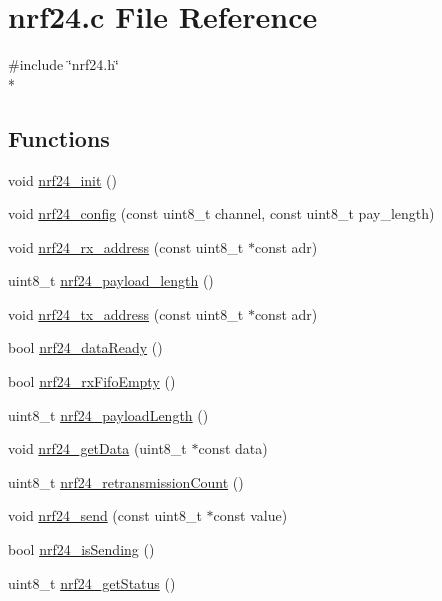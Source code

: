 \hypertarget{a00012}{\section{nrf24.\-c File Reference}
\label{a00012}
}
{\ttfamily \#include \char`\"{}nrf24.\-h\char`\"{}}\\*
\subsection*{Functions}
\begin{DoxyCompactItemize}
\item 
void \hyperlink{a00012_a74436d4829a431fcd9b5ef6ff76d0677}{nrf24\-\_\-init} ()
\item 
void \hyperlink{a00012_a97793f0c66a9d83e7180e54b6054e366}{nrf24\-\_\-config} (const uint8\-\_\-t channel, const uint8\-\_\-t pay\-\_\-length)
\item 
void \hyperlink{a00012_a1677d7e870aeb4a04f6816767bfe2608}{nrf24\-\_\-rx\-\_\-address} (const uint8\-\_\-t $\ast$const adr)
\item 
uint8\-\_\-t \hyperlink{a00012_a2cf62b6425bac2d6f51355a6cf4fe61e}{nrf24\-\_\-payload\-\_\-length} ()
\item 
void \hyperlink{a00012_ace01070c698770b24b2f3e0d22b415e0}{nrf24\-\_\-tx\-\_\-address} (const uint8\-\_\-t $\ast$const adr)
\item 
bool \hyperlink{a00012_a712c0b5e8c339da2e8f36cfbba8892ac}{nrf24\-\_\-data\-Ready} ()
\item 
bool \hyperlink{a00012_a9e05723f5fa753cfb2ea219e90eb3c2b}{nrf24\-\_\-rx\-Fifo\-Empty} ()
\item 
uint8\-\_\-t \hyperlink{a00012_a62aedbae7c08c9e560c6e95466067fce}{nrf24\-\_\-payload\-Length} ()
\item 
void \hyperlink{a00012_a30ee132dcb001aba61213da19bfc598f}{nrf24\-\_\-get\-Data} (uint8\-\_\-t $\ast$const data)
\item 
uint8\-\_\-t \hyperlink{a00012_ae0f50a459cd34957291713bb002893f8}{nrf24\-\_\-retransmission\-Count} ()
\item 
void \hyperlink{a00012_ada5868d8e82fb0676d2d4c913efd608e}{nrf24\-\_\-send} (const uint8\-\_\-t $\ast$const value)
\item 
bool \hyperlink{a00012_a126be099971800e98c2c0b0fa6910051}{nrf24\-\_\-is\-Sending} ()
\item 
uint8\-\_\-t \hyperlink{a00012_ab1cbb7a5d39d2d1389156e88d10ff85b}{nrf24\-\_\-get\-Status} ()
\item 

\end{DoxyCompactItemize}
